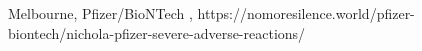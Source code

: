           {Melbourne, }
          {}
          {Pfizer/BioNTech}
          {}
          {
            ,
          }
          {https://nomoresilence.world/pfizer-biontech/nichola-pfizer-severe-adverse-reactions/}

